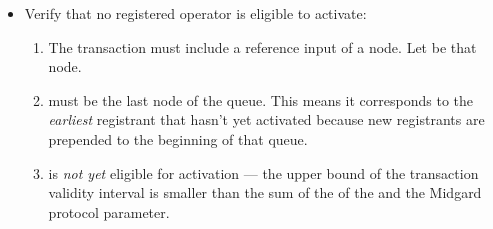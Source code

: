 \documentclass[../midgard.tex]{subfiles}
\begin{document}
\begin{description}
\begin{itemize}
            \item Verify that no registered operator is eligible to activate:
            \begin{enumerate}[resume]
                \item The transaction must include a reference input of a  node.
                  Let  be that node.
                \item {} must be the last node of the  queue.
                  This means it corresponds to the \emph{earliest} registrant that hasn't yet activated because new registrants are prepended to the beginning of that queue.
                \item {} is \emph{not yet} eligible for activation --- the upper bound of the transaction validity interval is smaller than the sum of the  of the  and the Midgard  protocol parameter.
            \end{enumerate}
        \end{itemize}
\end{description}
\end{document}
